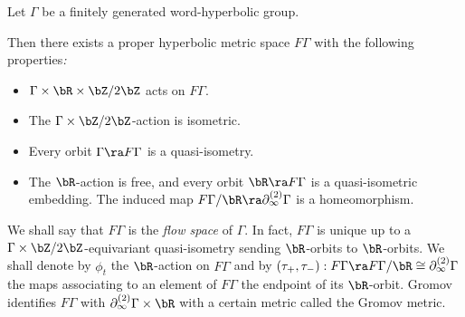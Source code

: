 \begin{theorem} 
	\label{thm:Mineyev} Let $\Gamma$ be a finitely generated word-hyperbolic group. 

Then there exists a proper hyperbolic metric space 
	$F\Gamma$ with the following properties\/{\em :}
	\begin{itemize} 
		\item[(i)] $\Gamma\times\bR\times\bZ/2\bZ$ acts on $F\Gamma$.
		\item[(ii)] The $\Gamma\times \bZ/2\bZ$-action is isometric.
		\item[(iii)] Every orbit $\Gamma\ra F\Gamma$ is a quasi-isometry. %
		\item[(iv)] The $\bR$-action is free, and every orbit $\bR \ra F\Gamma$ is a quasi-isometric embedding. 
		The induced map $F\Gamma/\bR \ra \partial_\infty^{(2)}\Gamma$ is a homeomorphism.
	\end{itemize}
\end{theorem}
We shall say that $F \Gamma$ is the {\em flow space} of $\Gamma$. 
In fact, $F \Gamma$ is unique up to a $\Gamma \times \bZ/2\bZ$-equivariant quasi-isometry sending $\bR$-orbits to $\bR$-orbits. 
We shall denote by $\phi_t$ the $\bR$-action on $F \Gamma$ and by 
$(\tau_+, \tau_-):F\Gamma \ra F\Gamma/\bR \cong \partial_\infty^{(2)}\Gamma$
the maps associating to an element of $F\Gamma$ 
the endpoint of its $\bR$-orbit.
Gromov identifies $F\Gamma$ with 
$\partial_\infty^{(2)} \Gamma \times \bR$ with a certain metric 
called the Gromov metric. 
%


